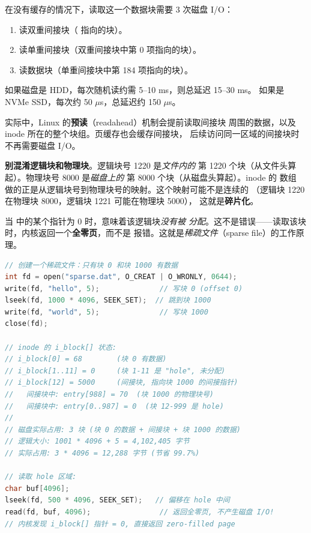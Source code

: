 \begin{filesystemlayout}
在没有缓存的情况下，读取这一个数据块需要 3 次磁盘 I/O：

\begin{enumerate}\tightlist
\item 读双重间接块（ 指向的块）。
\item 读单重间接块（双重间接块中第 0 项指向的块）。
\item 读数据块（单重间接块中第 184 项指向的块）。
\end{enumerate}

如果磁盘是 HDD，每次随机读约需 5--10 ms，则总延迟 15--30 ms。
如果是 NVMe SSD，每次约 50 $\mu$s，总延迟约 150 $\mu$s。

实际中，Linux 的\textbf{预读}（readahead）机制会提前读取间接块
周围的数据，以及 inode 所在的整个块组。页缓存也会缓存间接块，
后续访问同一区域的间接块时不再需要磁盘 I/O。

\begin{warningbox}
\textbf{别混淆逻辑块和物理块}。逻辑块号 1220 是\emph{文件内的}
第 1220 个块（从文件头算起）。物理块号 8000 是\emph{磁盘上的}
第 8000 个块（从磁盘头算起）。inode 的  数组
做的正是从逻辑块号到物理块号的映射。这个映射可能不是连续的
（逻辑块 1220 在物理块 8000，逻辑块 1221 可能在物理块 5000），
这就是\textbf{碎片化}。
\end{warningbox}


当  中的某个指针为 0 时，意味着该逻辑块\emph{没有被
分配}。这不是错误——读取该块时，内核返回一个\textbf{全零页}，而不是
报错。这就是\emph{稀疏文件}（sparse file）的工作原理。

\begin{lstlisting}[language=C]
// 创建一个稀疏文件：只有块 0 和块 1000 有数据
int fd = open("sparse.dat", O_CREAT | O_WRONLY, 0644);
write(fd, "hello", 5);              // 写块 0 (offset 0)
lseek(fd, 1000 * 4096, SEEK_SET);  // 跳到块 1000
write(fd, "world", 5);              // 写块 1000
close(fd);

// inode 的 i_block[] 状态:
// i_block[0] = 68        (块 0 有数据)
// i_block[1..11] = 0     (块 1-11 是 "hole", 未分配)
// i_block[12] = 5000     (间接块, 指向块 1000 的间接指针)
//   间接块中: entry[988] = 70  (块 1000 的物理块号)
//   间接块中: entry[0..987] = 0  (块 12-999 是 hole)
//
// 磁盘实际占用: 3 块 (块 0 的数据 + 间接块 + 块 1000 的数据)
// 逻辑大小: 1001 * 4096 + 5 = 4,102,405 字节
// 实际占用: 3 * 4096 = 12,288 字节 (节省 99.7%)

// 读取 hole 区域:
char buf[4096];
lseek(fd, 500 * 4096, SEEK_SET);   // 偏移在 hole 中间
read(fd, buf, 4096);                // 返回全零页, 不产生磁盘 I/O!
// 内核发现 i_block[] 指针 = 0, 直接返回 zero-filled page
\end{lstlisting}


\end{filesystemlayout}
